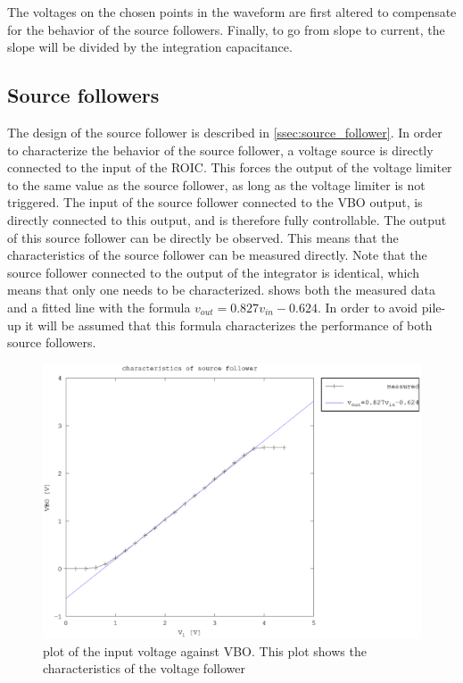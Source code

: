 The voltages on the chosen points in the waveform are first altered to compensate for the behavior of the source followers. Finally, to go from slope to current, the slope will be divided by the integration capacitance. 



\subsection{Source followers}\label{ssec:dynamic_source_followers}
The design of the source follower is described in \cref{ssec:source_follower}. In order to characterize the behavior of the source follower, a voltage source is directly connected to the input of the ROIC. This forces the output of the voltage limiter to the same value as the source follower, as long as the voltage limiter is not triggered. The input of the source follower connected to the VBO output, is directly connected to this output, and is therefore fully controllable. The output of this source follower can be directly be observed. This means that the characteristics of the source follower can be measured directly. Note that the source follower connected to the output of the integrator is identical, which means that only one needs to be characterized.  shows both the measured data and a fitted line with the formula $v_{out}=0.827v_{in}-0.624$. In order to avoid pile-up it will be assumed that this formula characterizes the performance of both source followers.

\begin{figure}[h]
        \centering
            \includegraphics[width=\textwidth]{fig/source_follower.eps}
            \caption[]
                {plot of the input voltage against VBO. This plot shows the characteristics of the voltage follower}    
                \label{fig:source_follower}
        \end{figure}


